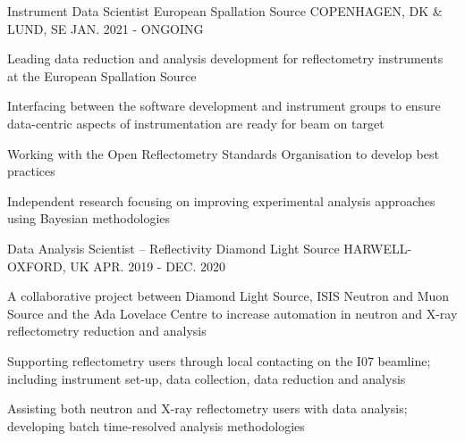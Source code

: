 \begin{cventries}
  \cventry
    {Instrument Data Scientist}
    {European Spallation Source}
    {COPENHAGEN, DK \& LUND, SE}
    {JAN. 2021 - ONGOING}
    {
      \begin{cvitems}
        \item {Leading data reduction and analysis development for reflectometry instruments at the European Spallation Source}
        \item {Interfacing between the software development and instrument groups to ensure data-centric aspects of instrumentation are ready for beam on target}
        \item {Working with the Open Reflectometry Standards Organisation to develop best practices}
        \item {Independent research focusing on improving experimental analysis approaches using Bayesian methodologies}
      \end{cvitems}
    }
  \cventry
    {Data Analysis Scientist -- Reflectivity}
    {Diamond Light Source}
    {HARWELL-OXFORD, UK}
    {APR. 2019 - DEC. 2020}
    {
      \begin{cvitems}
        \item {A collaborative project between Diamond Light Source, ISIS Neutron and Muon Source and the Ada Lovelace Centre to increase automation in neutron and X-ray reflectometry reduction and analysis}
        \item {Supporting reflectometry users through local contacting on the I07 beamline; including instrument set-up, data collection, data reduction and analysis}
        \item {Assisting both neutron and X-ray reflectometry users with data analysis; developing batch time-resolved analysis methodologies}
      \end{cvitems}
    }
\end{cventries}

